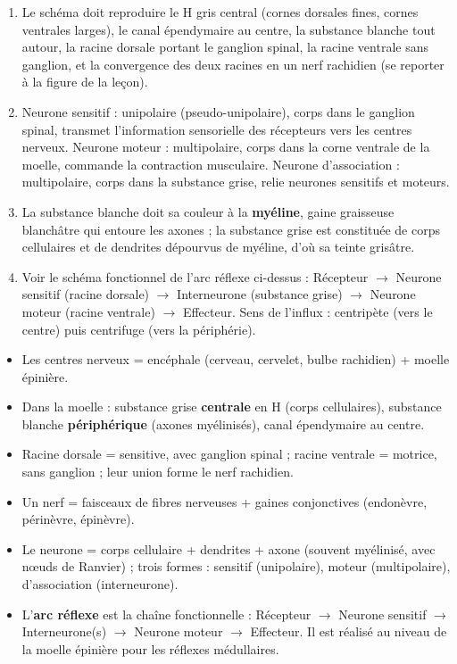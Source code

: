 \documentclass[11pt]{article}
\begin{document}
\begin{corrige}
\begin{enumerate}
\item Le schéma doit reproduire le H gris central (cornes dorsales fines, cornes ventrales larges), le canal épendymaire au centre, la substance blanche tout autour, la racine dorsale portant le ganglion spinal, la racine ventrale sans ganglion, et la convergence des deux racines en un nerf rachidien (se reporter à la figure de la leçon).
\item Neurone sensitif : unipolaire (pseudo-unipolaire), corps dans le ganglion spinal, transmet l'information sensorielle des récepteurs vers les centres nerveux. Neurone moteur : multipolaire, corps dans la corne ventrale de la moelle, commande la contraction musculaire. Neurone d'association : multipolaire, corps dans la substance grise, relie neurones sensitifs et moteurs.
\item La substance blanche doit sa couleur à la \textbf{myéline}, gaine graisseuse blanchâtre qui entoure les axones ; la substance grise est constituée de corps cellulaires et de dendrites dépourvus de myéline, d'où sa teinte grisâtre.
\item Voir le schéma fonctionnel de l'arc réflexe ci-dessus : Récepteur $\rightarrow$ Neurone sensitif (racine dorsale) $\rightarrow$ Interneurone (substance grise) $\rightarrow$ Neurone moteur (racine ventrale) $\rightarrow$ Effecteur. Sens de l'influx : centripète (vers le centre) puis centrifuge (vers la périphérie).
\end{enumerate}
\end{corrige}

\begin{aretenir}
\begin{itemize}
\item Les centres nerveux = encéphale (cerveau, cervelet, bulbe rachidien) + moelle épinière.
\item Dans la moelle : substance grise \textbf{centrale} en H (corps cellulaires), substance blanche \textbf{périphérique} (axones myélinisés), canal épendymaire au centre.
\item Racine dorsale = sensitive, avec ganglion spinal ; racine ventrale = motrice, sans ganglion ; leur union forme le nerf rachidien.
\item Un nerf = faisceaux de fibres nerveuses + gaines conjonctives (endonèvre, périnèvre, épinèvre).
\item Le neurone = corps cellulaire + dendrites + axone (souvent myélinisé, avec nœuds de Ranvier) ; trois formes : sensitif (unipolaire), moteur (multipolaire), d'association (interneurone).
\item L'\textbf{arc réflexe} est la chaîne fonctionnelle : Récepteur $\rightarrow$ Neurone sensitif $\rightarrow$ Interneurone(s) $\rightarrow$ Neurone moteur $\rightarrow$ Effecteur. Il est réalisé au niveau de la moelle épinière pour les réflexes médullaires.
\end{itemize}
\end{aretenir}
\end{document}
